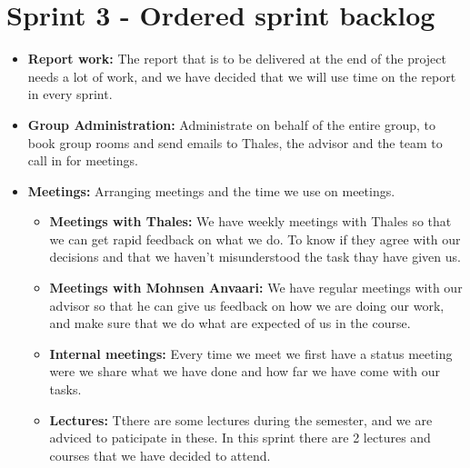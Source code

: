 

\section{Sprint 3 - Ordered sprint backlog}

\begin{itemize}
\item{}\textbf{Report work:} The report that is to be delivered at the end of the project needs a lot of work, and we have decided that we will use time on the report in every sprint.
\item{}\textbf{Group Administration:} Administrate on behalf of the entire group, to book group rooms and send emails to Thales, the advisor and the team to call in for meetings.
\item{}\textbf{Meetings:} Arranging meetings and the time we use on meetings.
\begin{itemize}
\item{}\textbf{Meetings with Thales:} We have weekly meetings with Thales so that we can get rapid feedback on what we do. To know if they agree with our decisions and that we haven't misunderstood the task thay have given us.
\item{}\textbf{Meetings with Mohnsen Anvaari:} We have regular meetings with our advisor so that he can give us feedback on how we are doing our work, and make sure that we do what are expected of us in the course.
\item{}\textbf{Internal meetings:} Every time we meet we first have a status meeting were we share what we have done and how far we have come with our tasks.
\item{}\textbf{Lectures:} Tthere are some lectures during the semester, and we are adviced to paticipate in these. In this sprint there are 2 lectures and courses that we have decided to attend.
\end{itemize}

\newpage



\end{itemize}
